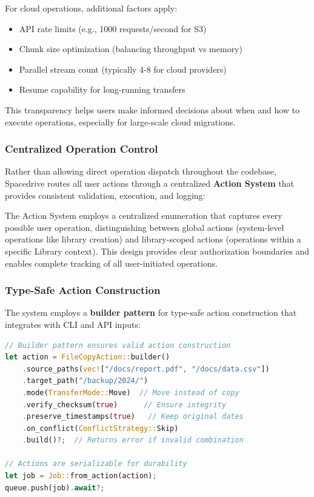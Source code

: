 \documentclass[sigconf]{acmart}
\begin{document}
For cloud operations, additional factors apply:
\begin{itemize}
    \item API rate limits (e.g., 1000 requests/second for S3)
    \item Chunk size optimization (balancing throughput vs memory)
    \item Parallel stream count (typically 4-8 for cloud providers)
    \item Resume capability for long-running transfers
\end{itemize}

This transparency helps users make informed decisions about when and how to execute operations, especially for large-scale cloud migrations.

\subsubsection{Centralized Operation Control}

Rather than allowing direct operation dispatch throughout the codebase, Spacedrive routes all user actions through a centralized \textbf{Action System} that provides consistent validation, execution, and logging:

The Action System employs a centralized enumeration that captures every possible user operation, distinguishing between global actions (system-level operations like library creation) and library-scoped actions (operations within a specific Library context). This design provides clear authorization boundaries and enables complete tracking of all user-initiated operations.

\subsubsection{Type-Safe Action Construction}

The system employs a \textbf{builder pattern} for type-safe action construction that integrates with CLI and API inputs:

\begin{lstlisting}[language=Rust, caption={Type-safe action construction with builder pattern}]
// Builder pattern ensures valid action construction
let action = FileCopyAction::builder()
    .source_paths(vec!["/docs/report.pdf", "/docs/data.csv"])
    .target_path("/backup/2024/")
    .mode(TransferMode::Move)  // Move instead of copy
    .verify_checksum(true)      // Ensure integrity
    .preserve_timestamps(true)   // Keep original dates
    .on_conflict(ConflictStrategy::Skip)
    .build()?;  // Returns error if invalid combination

// Actions are serializable for durability
let job = Job::from_action(action);
queue.push(job).await?;
\end{lstlisting}
\end{document}

